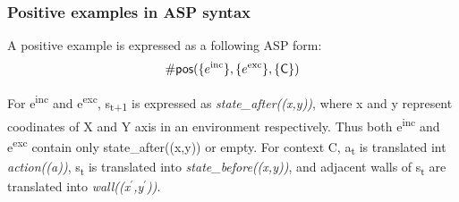 \subsubsection{Positive examples in ASP syntax}
\label{subsubsec:positive_examples_asp_syntax}
A positive example is expressed as a following ASP form:
\begin{equation}
\begin{split}
    \textsf{\#pos}(\{e\textsuperscript{inc}\}, \{e\textsuperscript{exc}\}, \textsf{\{C\}})
\end{split}
\end{equation}

For e\textsuperscript{inc} and e\textsuperscript{exc}, s\textsubscript{t+1} is expressed as \textit{state\_after((x,y))}, where x and y represent coodinates of X and Y axis in an environment respectively.
Thus both e\textsuperscript{inc} and e\textsuperscript{exc} contain only state\_after((x,y)) or empty.
For context C, a\textsubscript{t} is translated int \textit{action((a))}, s\textsubscript{t} is translated into \textit{state\_before((x,y))}, and adjacent walls of s\textsubscript{t} are translated into \textit{wall((x$^\prime$,y$^\prime$))}.



